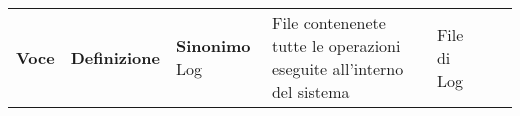 
\begin{tabularx}{\textwidth}
    {|c|>{\raggedright}X|l|}

    \hline {}

    \n {}
    \Large\textbf{Voce} & \Large\centering\textbf{Definizione}                                  & \Large\textbf{Sinonimo} %
    \n Log              & File contenenete tutte le operazioni eseguite all'interno del sistema & File di Log
    \n
\end{tabularx}